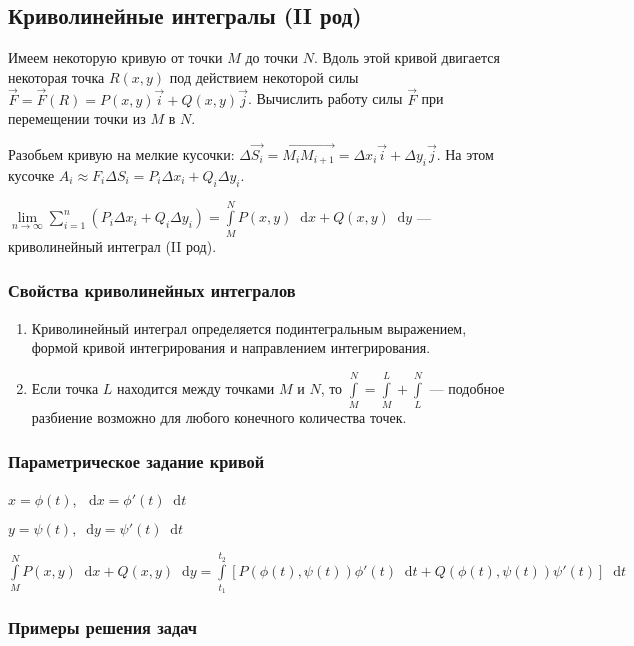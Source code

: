 \documentclass{article}
\newcommand*\diff{\mathop{}\!\mathrm{d}}
\begin{document}
\subsection{Криволинейные интегралы (II род)}

Имеем некоторую кривую от точки $M$ до точки $N$. Вдоль этой кривой двигается некоторая точка $R(x, y)$ под действием некоторой силы $\overrightarrow{F} = \overrightarrow{F}(R) = P(x, y) \overrightarrow{i} + Q(x, y) \overrightarrow{j}$. Вычислить работу силы $\overrightarrow{F}$ при перемещении точки из $M$ в $N$.

Разобьем кривую на мелкие кусочки: $\Delta \overrightarrow{S_{i}} = \overrightarrow{M_{i} M_{i + 1}} = \Delta x_i \overrightarrow{i} + \Delta y_i \overrightarrow{j}$. На этом кусочке $A_{i} \approx F_{i} \Delta S_{i} = P_{i} \Delta x_{i} + Q_{i} \Delta y_{i}$.

$\lim\limits_{n \to \infty} \sum\limits_{i = 1}^{n} (P_{i} \Delta x_{i} + Q_{i} \Delta y_{i}) = \int\limits_{M}^{N} P(x, y) \diff x + Q(x, y) \diff y$ — криволинейный интеграл (II род).

\subsubsection{Свойства криволинейных интегралов}

\begin{enumerate}
    \item Криволинейный интеграл определяется подинтегральным выражением, формой кривой интегрирования и направлением интегрирования.
    \item Если точка $L$ находится между точками $M$ и $N$, то $\int\limits_{M}^{N} = \int\limits_{M}^{L} + \int\limits_{L}^{N}$ — подобное разбиение возможно для любого конечного количества точек.
\end{enumerate}

\subsubsection{Параметрическое задание кривой}

$x = \phi(t)$, $\diff x = \phi'(t) \diff t$

$y = \psi(t), \diff y = \psi'(t) \diff t$

$\int\limits_{M}^{N} P(x, y) \diff x + Q(x, y) \diff y = \int\limits_{t_1}^{t_2} [P(\phi(t), \psi(t)) \phi'(t) \diff t + Q(\phi(t), \psi(t)) \psi'(t)] \diff t$

\subsubsection{Примеры решения задач}
\end{document}
